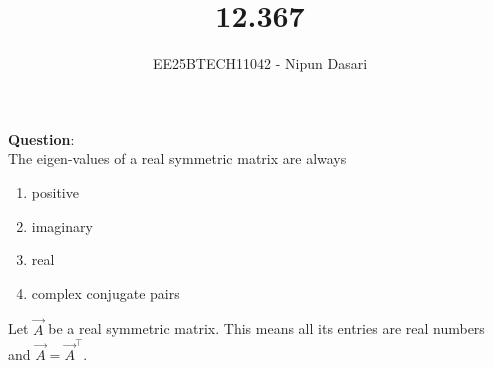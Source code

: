 \documentclass[journal]{IEEEtran}
\begin{document}
	
	
	\vspace{3cm}
	
	\title{12.367}
	\author{EE25BTECH11042 - Nipun Dasari}
	\maketitle
	
	\renewcommand{\thefigure}{\theenumi}
	\renewcommand{\thetable}{\theenumi}
	\setlength{\intextsep}{10pt}
	
	\renewcommand{\thetable}{\theenumi}
	
	\textbf{Question}:\\
	The eigen-values of a real symmetric matrix are always
	\begin{enumerate}[label=\alph*)]
		\item positive
		\item imaginary
		\item real
		\item complex conjugate pairs
	\end{enumerate}
	
	\solution	
	Let $\vec{A}$ be a real symmetric matrix. This means all its entries are real numbers and $\vec{A} = \vec{A}^\top$.
	
\end{document}
